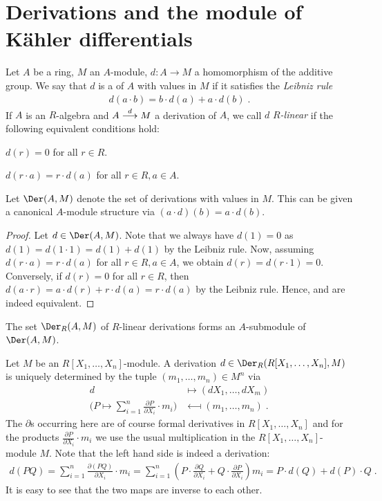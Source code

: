 \documentclass[a4paper,parskip=half,numbers=enddot, DIV=12]{scrreprt}
\begin{document}
\section{Derivations and the module of Kähler differentials}
\begin{defi}[Derivations]
    Let $A$ be a ring, $M$ an $A$-module, $d\colon A\to M$  a homomorphism of the additive group. We say that $d$ is a  of $A$ with values in $M$ if it satisfies the \emph{Leibniz rule} 
    \begin{align*}
    	 d(a\cdot b) = b\cdot d(a) + a\cdot d(b)\;.
    \end{align*}
     If $A$ is an $R$-algebra and $A\morphism[d] M$ a derivation of $A$, we call $d$ \emph{$R$-linear} if the following equivalent conditions hold:
    \begin{alphanumerate}
        \item 
            $d(r) = 0$ for all $r\in R$.
        \item
            $d(r\cdot a) = r\cdot d(a)$ for all $r\in R, a\in A$.
    \end{alphanumerate}
    Let $\Der(A,M)$ denote the set of derivations with values in $M$. This can be given a canonical $A$-module structure via $(a\cdot d)(b) = a\cdot d(b)$.
\end{defi}
\begin{proof}
    Let $d\in \Der(A,M)$. Note that we always have $d(1)=0$ as $d(1)=d(1\cdot1)=d(1)+d(1)$ by the Leibniz rule. Now, assuming $d(r\cdot a)=r\cdot d(a)$ for all $r\in R, a\in A$, we obtain $d(r)=d(r\cdot1)=0$. Conversely, if $d(r)=0$ for all $r\in R$, then $d(a\cdot r) = a\cdot d(r) + r\cdot d(a) = r\cdot d(a)$ by the Leibniz rule. Hence,  and  are indeed equivalent.
\end{proof}
\begin{rem}
    The set $\Der_R(A,M)$ of $R$-linear derivations forms an $A$-submodule of $\Der(A,M)$.
\end{rem}
\begin{example}
    Let $M$ be an $R[X_1,\ldots,X_n]$-module. A derivation $d\in\Der_R(R[X_1,\ldots,X_n], M)$ is uniquely determined by the tuple $(m_1,\ldots,m_n)\in M^n$ via
    \begin{align*}
        d&\longmapsto (dX_1,\ldots,dX_m)\\
        \bigg(P\mapsto \sum_{i=1}^n\frac{\partial P}{\partial X_i}\cdot m_i \bigg) &\longmapsfrom (m_1,\ldots,m_n)\;.
    \end{align*}
    The $\partial$s occurring here are of course formal derivatives in $R[X_1,\ldots,X_n]$ and for the products $\frac{\partial P}{\partial X_i}\cdot m_i$ we use the usual multiplication in the $R[X_1,\ldots,X_n]$-module $M$. Note that the left hand side is indeed a derivation:
    \begin{align*}
        d(PQ) = \sum_{i=1}^n \frac{\partial(PQ)}{\partial X_i} \cdot m_i = \sum_{i=1}^n \left( P \cdot\frac{\partial Q}{\partial X_i} + Q\cdot\frac{\partial P}{\partial X_i} \right) m_i = P\cdot d(Q) + d(P)\cdot Q\;.
    \end{align*}
    It is easy to see that the two maps are inverse to each other.
\end{example}
\end{document}

